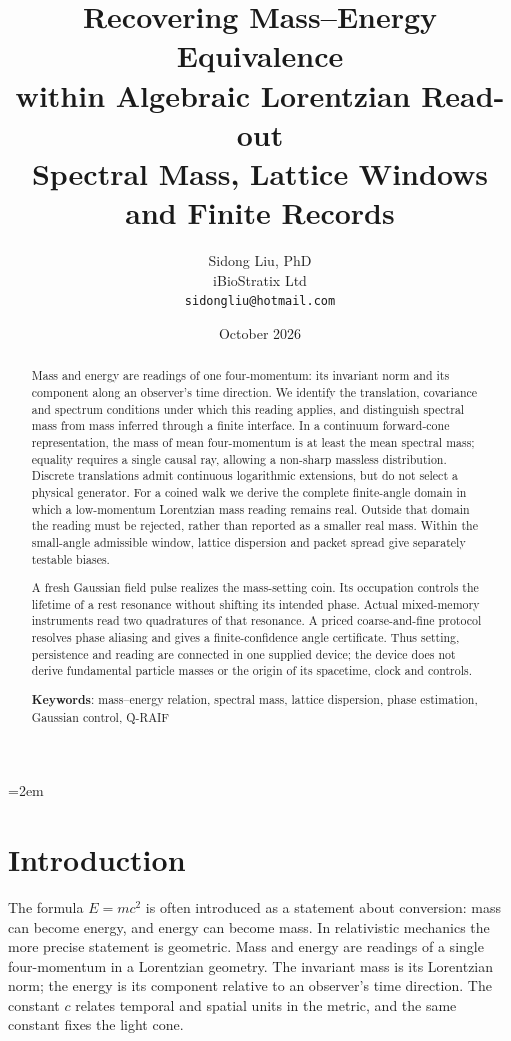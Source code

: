 \documentclass[12pt,a4paper]{article}
\title{%
  \textbf{Recovering Mass--Energy Equivalence}\\
  \textbf{within Algebraic Lorentzian Read-out}\\
  \large Spectral Mass, Lattice Windows and Finite Records%
}
\author{
  Sidong Liu, PhD \\
  \small iBioStratix Ltd \\
  \small \texttt{sidongliu@hotmail.com}
}
\date{October 2026}
\theoremstyle{definition}
\theoremstyle{remark}
\begin{document}
\emergencystretch=2em
\raggedbottom

\maketitle

\begin{abstract}
Mass and energy are readings of one four-momentum: its invariant norm and its component along an observer's time direction. We identify the translation, covariance and spectrum conditions under which this reading applies, and distinguish spectral mass from mass inferred through a finite interface. In a continuum forward-cone representation, the mass of mean four-momentum is at least the mean spectral mass; equality requires a single causal ray, allowing a non-sharp massless distribution. Discrete translations admit continuous logarithmic extensions, but do not select a physical generator. For a coined walk we derive the complete finite-angle domain in which a low-momentum Lorentzian mass reading remains real. Outside that domain the reading must be rejected, rather than reported as a smaller real mass. Within the small-angle admissible window, lattice dispersion and packet spread give separately testable biases.

A fresh Gaussian field pulse realizes the mass-setting coin. Its occupation controls the lifetime of a rest resonance without shifting its intended phase. Actual mixed-memory instruments read two quadratures of that resonance. A priced coarse-and-fine protocol resolves phase aliasing and gives a finite-confidence angle certificate. Thus setting, persistence and reading are connected in one supplied device; the device does not derive fundamental particle masses or the origin of its spacetime, clock and controls.

\medskip
\noindent\textbf{Keywords}: mass--energy relation, spectral mass, lattice dispersion, phase estimation, Gaussian control, Q-RAIF
\end{abstract}

\section{Introduction}
\label{sec:introduction}

The formula $E=mc^2$ is often introduced as a statement about conversion: mass can become energy, and energy can become mass. In relativistic mechanics the more precise statement is geometric. Mass and energy are readings of a single four-momentum in a Lorentzian geometry. The invariant mass is its Lorentzian norm; the energy is its component relative to an observer's time direction. The constant $c$ relates temporal and spatial units in the metric, and the same constant fixes the light cone.
\end{document}
